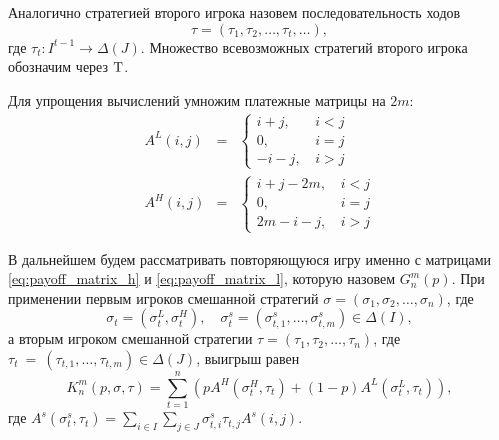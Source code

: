 Аналогично стратегией второго игрока назовем последовательность ходов
\[
  \tau = (\tau_1, \tau_2, \ldots, \tau_t, \ldots),
\]
где $ \tau_t: I^{t-1} \rightarrow \Delta(J) $. Множество всевозможных стратегий второго игрока обозначим через $ \mathrm{T} $.

Для упрощения вычислений умножим платежные матрицы на $ 2m $:
\begin{eqnarray}
\label{eq:payoff_matrix_h}
A^L(i, j) &=& \begin{cases}
  i + j, &\, i < j\\
  0, &\, i = j\\
  -i - j, &\, i > j
\end{cases}
\\
\label{eq:payoff_matrix_l}
A^H(i, j) &=& \begin{cases}
  i + j - 2m, &\, i < j\\
  0, &\, i = j\\
  2m - i - j, &\, i > j
\end{cases}
\end{eqnarray}

В дальнейшем будем рассматривать повторяющуюся игру именно с матрицами \eqref{eq:payoff_matrix_h} и \eqref{eq:payoff_matrix_l}, которую назовем $ G_n^m(p) $. При применении первым игроков смешанной стратегий 
$ \sigma = (\sigma_1, \sigma_2, \ldots, \sigma_n) $, где 
\[ 
  \sigma_t = (\sigma_t^L, \sigma_t^H), \quad
  \sigma^s_t = (\sigma^s_{t, 1}, \ldots, \sigma^s_{t, m}) \in \Delta(I),
\] 
а вторым игроком смешанной стратегии 
$ \tau = (\tau_1, \tau_2, \ldots, \tau_n) $, где
$ \tau_t~=~(\tau_{t, 1}, \ldots, \tau_{t, m}) \in \Delta(J) $,
выигрыш равен
\begin{equation}
\label{eq:value_of_game_n}
K_n^m(p, \sigma, \tau) = \sum_{t=1}^n
    \left(
        pA^H(\sigma_t^H, \tau_t) + (1 - p)A^L(\sigma_t^L, \tau_t)
    \right),
\end{equation}
где 
$ 
  A^s(\sigma^s_t,\tau_t) = 
    \sum_{i \in I}
      \sum_{j \in J}
        \sigma^s_{t, i} \tau_{t, j} A^s(i, j).
$